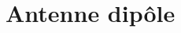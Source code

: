 \documentclass[Deriaz_Traiber_Labo02]{subfiles}
\begin{document}
\chapter{Antenne dipôle}
\end{document}
